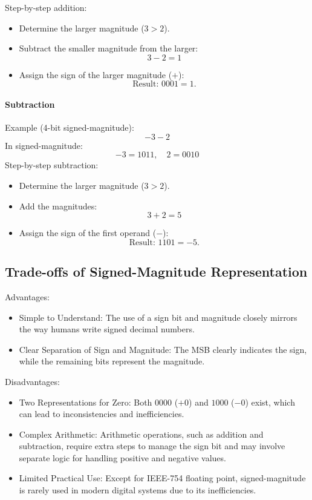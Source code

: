 Step-by-step addition:
\begin{itemize}
    \item Determine the larger magnitude (\( 3 > 2 \)).
    \item Subtract the smaller magnitude from the larger:
   \[
   3 - 2 = 1
   \]
    \item Assign the sign of the larger magnitude (\( + \)):
   \[
   \text{Result: } 0001 = 1.
   \]

\end{itemize}

\paragraph{Subtraction} Example (4-bit signed-magnitude):
\[
-3 - 2
\]
In signed-magnitude:
\[
-3 = 1011, \quad 2 = 0010
\]
Step-by-step subtraction:
\begin{itemize}
    \item Determine the larger magnitude (\( 3 > 2 \)).
    \item Add the magnitudes:
   \[
   3 + 2 = 5
   \]
    \item Assign the sign of the first operand (\( - \)):
   \[
   \text{Result: } 1101 = -5.
   \]
\end{itemize}

\subsection{Trade-offs of Signed-Magnitude Representation}
Advantages:
\begin{itemize}
    \item Simple to Understand: The use of a sign bit and magnitude closely mirrors the way humans write signed decimal numbers.
    \item Clear Separation of Sign and Magnitude: The MSB clearly indicates the sign, while the remaining bits represent the magnitude.
\end{itemize}

Disadvantages:
\begin{itemize}
    \item Two Representations for Zero: Both \( 0000 \) (\( +0 \)) and \( 1000 \) (\( -0 \)) exist, which can lead to inconsistencies and inefficiencies.
    \item Complex Arithmetic: Arithmetic operations, such as addition and subtraction, require extra steps to manage the sign bit and may involve separate logic for handling positive and negative values.
    \item Limited Practical Use: Except for IEEE-754 floating point, signed-magnitude is rarely used in modern digital systems due to its inefficiencies.
\end{itemize}


